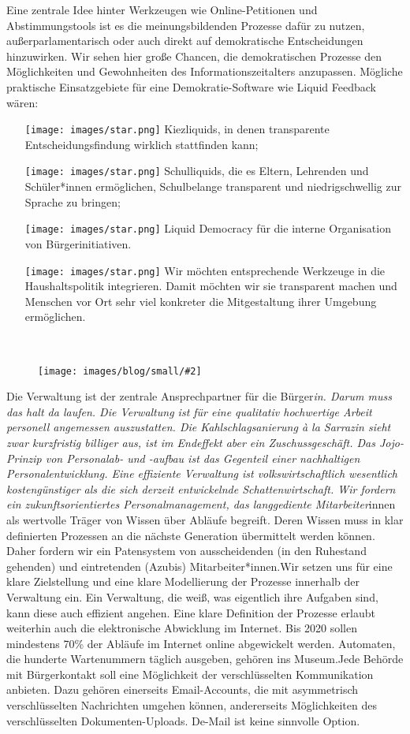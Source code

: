 \documentclass[a4paper,10pt]{article}
\newcommand{\mysection}[1]{{\vspace{1cm}\noindent\color{gray}{\ttfamily\LARGE\raggedright #1}\\\medskip}}
\newcommand{\abschnitt}[2]{%
\mysection{\raggedright #1}%
\begin{figure}[t]%
\vspace*{-2.7cm}%
\hspace*{-2.1cm}%
\texttt{[image: images/blog/small/\#2]} %
\end{figure}%
}
\begin{document}
Eine zentrale Idee hinter Werkzeugen wie Online-Petitionen und
Abstimmungstools ist es die meinungsbildenden Prozesse dafür zu nutzen,
außerparlamentarisch oder auch direkt auf demokratische Entscheidungen
hinzuwirken. Wir sehen hier große Chancen, die demokratischen Prozesse
den Möglichkeiten und Gewohnheiten des Informationszeitalters
anzupassen. Mögliche praktische Einsatzgebiete für eine
Demokratie-Software wie Liquid Feedback wären:

\begin{itemize}
\itemsep1pt\parskip0pt
\item[\texttt{[image: images/star.png]}]
  Kiezliquids, in denen transparente Entscheidungsfindung wirklich
  stattfinden kann;
\item[\texttt{[image: images/star.png]}]
  Schulliquids, die es Eltern, Lehrenden und Schüler*innen ermöglichen,
  Schulbelange transparent und niedrigschwellig zur Sprache zu bringen;
\item[\texttt{[image: images/star.png]}]
  Liquid Democracy für die interne Organisation von Bürgerinitiativen.
\item[\texttt{[image: images/star.png]}]
  Wir möchten entsprechende Werkzeuge in die Haushaltspolitik
  integrieren. Damit möchten wir sie transparent machen und Menschen vor
  Ort sehr viel konkreter die Mitgestaltung ihrer Umgebung ermöglichen.
\end{itemize}

\clearpage
\abschnitt{Verwaltung}{GefahrengebietTermine.png}

\enlargethispage{2\baselineskip}
Die Verwaltung ist der zentrale Ansprechpartner für die Bürger\emph{in.
Darum muss das halt da laufen. Die Verwaltung ist für eine qualitativ
hochwertige Arbeit personell angemessen auszustatten. Die
Kahlschlagsanierung à la Sarrazin sieht zwar kurzfristig billiger aus,
ist im Endeffekt aber ein Zuschussgeschäft. Das Jojo-Prinzip von
Personalab- und -aufbau ist das Gegenteil einer nachhaltigen
Personalentwicklung. Eine effiziente Verwaltung ist volkswirtschaftlich
wesentlich kostengünstiger als die sich derzeit entwickelnde
Schattenwirtschaft. Wir fordern ein zukunftsorientiertes
Personalmanagement, das langgediente Mitarbeiter}innen als wertvolle
Träger von Wissen über Abläufe begreift. Deren Wissen muss in klar
definierten Prozessen an die nächste Generation übermittelt werden
können. Daher fordern wir ein Patensystem von ausscheidenden (in den
Ruhestand gehenden) und eintretenden (Azubis) Mitarbeiter*innen.Wir
setzen uns für eine klare Zielstellung und eine klare Modellierung der
Prozesse innerhalb der Verwaltung ein. Ein Verwaltung, die weiß, was
eigentlich ihre Aufgaben sind, kann diese auch effizient angehen. Eine
klare Definition der Prozesse erlaubt weiterhin auch die elektronische
Abwicklung im Internet. Bis 2020 sollen mindestens 70\% der Abläufe im
Internet online abgewickelt werden. Automaten, die hunderte Wartenummern
täglich ausgeben, gehören ins Museum.Jede Behörde mit Bürgerkontakt soll
eine Möglichkeit der verschlüsselten Kommunikation anbieten. Dazu
gehören einerseits Email-Accounts, die mit asymmetrisch verschlüsselten
Nachrichten umgehen können, andererseits Möglichkeiten des
verschlüsselten Dokumenten-Uploads. De-Mail ist keine sinnvolle Option.
\end{document}
